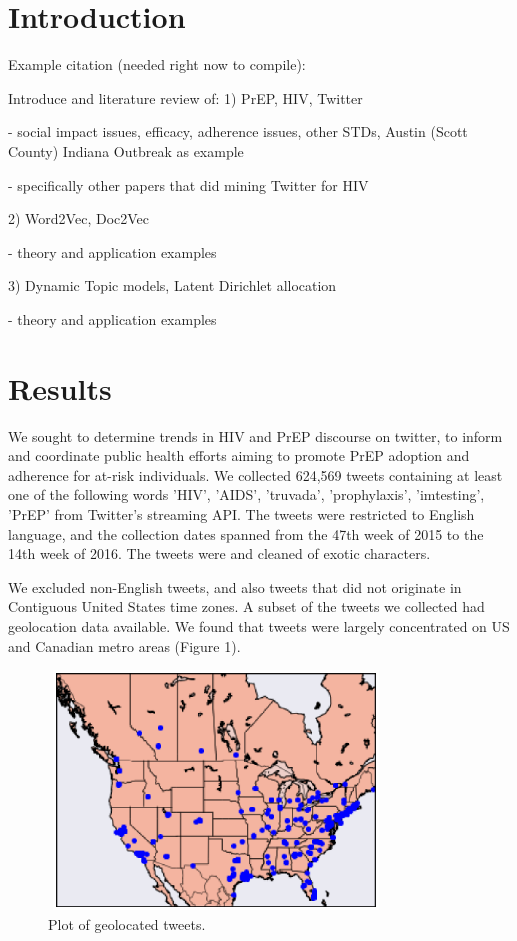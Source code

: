 \documentclass{sig-alternate-05-2015}
\begin{document}
\section{Introduction}
Example citation (needed right now to compile):\cite{Lamport:LaTeX}

Introduce and literature review of:
1) PrEP, HIV, Twitter

 - social impact issues, efficacy, adherence issues, other STDs, Austin (Scott County) Indiana Outbreak as example
 
 - specifically other papers that did mining Twitter for HIV


2) Word2Vec, Doc2Vec

 - theory and application examples

3) Dynamic Topic models, Latent Dirichlet allocation

- theory and application examples

\section{Results}



We sought to determine trends in HIV and PrEP discourse on twitter, to inform and coordinate public health efforts aiming to promote PrEP adoption and adherence for at-risk individuals. We collected 624,569 tweets containing at least one of the following words 'HIV', 'AIDS', 'truvada', 'prophylaxis', 'imtesting', 'PrEP' from Twitter's streaming API. The tweets were restricted to English language, and the collection dates spanned from the 47th week of 2015 to the 14th week of 2016. The tweets were and cleaned of exotic characters.



We excluded non-English tweets, and also tweets that did not originate in Contiguous United States time zones. A subset of the tweets we collected had geolocation data available. We found that tweets were largely concentrated on US and Canadian metro areas (Figure 1).


\begin{figure}
\centering
\includegraphics[height=2.5in, width=3.5in]{map}
\caption{Plot of geolocated tweets.}
\end{figure}
\end{document}
